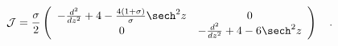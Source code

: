 \begin{equation} {\cal J}=\frac{\sigma}{2}\left( \begin{array}{cc}
-\frac{d^2}{dz^2}+4 -\frac{4(1+\sigma)}{\sigma} \sech^2 z & 0 \\ 0
& -\frac{d^2}{dz^2}+4 -6\sech^2 z
\end{array} \right) \quad . \label{eq:hesstk11}
\end{equation}

